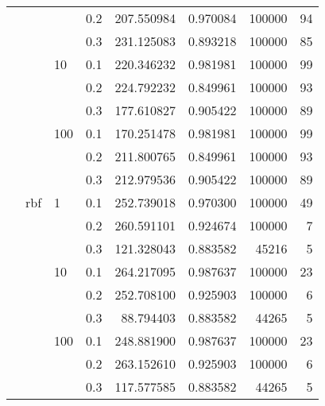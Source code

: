 \begin{table}[H]
\begin{tabular}{llllrrrr}
           &     &     & 0.2 &  207.550984 &  0.970084 &  100000 &    94 \\
           &     &     & 0.3 &  231.125083 &  0.893218 &  100000 &    85 \\
           &     & 10  & 0.1 &  220.346232 &  0.981981 &  100000 &    99 \\
           &     &     & 0.2 &  224.792232 &  0.849961 &  100000 &    93 \\
           &     &     & 0.3 &  177.610827 &  0.905422 &  100000 &    89 \\
           &     & 100 & 0.1 &  170.251478 &  0.981981 &  100000 &    99 \\
           &     &     & 0.2 &  211.800765 &  0.849961 &  100000 &    93 \\
           &     &     & 0.3 &  212.979536 &  0.905422 &  100000 &    89 \\
           & rbf & 1   & 0.1 &  252.739018 &  0.970300 &  100000 &    49 \\
           &     &     & 0.2 &  260.591101 &  0.924674 &  100000 &     7 \\
           &     &     & 0.3 &  121.328043 &  0.883582 &   45216 &     5 \\
           &     & 10  & 0.1 &  264.217095 &  0.987637 &  100000 &    23 \\
           &     &     & 0.2 &  252.708100 &  0.925903 &  100000 &     6 \\
           &     &     & 0.3 &   88.794403 &  0.883582 &   44265 &     5 \\
           &     & 100 & 0.1 &  248.881900 &  0.987637 &  100000 &    23 \\
           &     &     & 0.2 &  263.152610 &  0.925903 &  100000 &     6 \\
           &     &     & 0.3 &  117.577585 &  0.883582 &   44265 &     5 \\
\bottomrule
\end{tabular}
\end{table}
